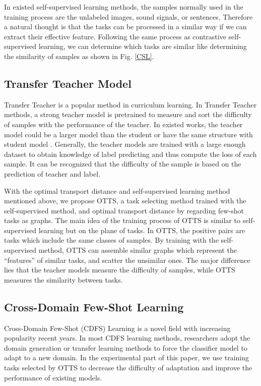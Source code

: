 \documentclass[10pt,journal,compsoc]{IEEEtran}
\begin{document}
In existed self-supervised learning methods, the samples normally used in the training process are the unlabeled images, sound signals, or sentences. Therefore a natural thought is that the tasks can be processed in a similar way if we can extract their effective feature. Following the same process as contrastive self-supervised learning, we can determine which tasks are similar like determining the similarity of samples as shown in Fig. \ref{CSL}. 

\subsection{Transfer Teacher Model}

Transfer Teacher is a popular method in curriculum learning. In Transfer Teacher methods, a strong teacher model is pretrained to measure and sort the difficulty of samples with the performance of the teacher. In existed works, the teacher model could be a larger model than the student \cite{transfer_teacher_1} or have the same structure with student model \cite{transfer_teacher_2}. Generally, the teacher models are trained with a large enough dataset to obtain knowledge of label predicting and thus compute the loss of each sample. It can be recognized that the difficulty of the sample is based on the prediction of teacher and label.

With the optimal transport distance and self-supervised learning method mentioned above, we propose OTTS, a task selecting method trained with the self-supervised method, and optimal transport distance by regarding few-shot tasks as graphs. The main idea of the training process of OTTS is similar to self-supervised learning but on the plane of tasks. In OTTS, the positive pairs are tasks which include the same classes of samples. By training with the self-supervised method, OTTS can assemble similar graphs which represent the “features” of similar tasks, and scatter the unsimilar ones. The major difference lies that the teacher models measure the difficulty of samples, while OTTS measures the similarity between tasks.

\subsection{Cross-Domain Few-Shot Learning}

Cross-Domain Few-Shot (CDFS) Learning \cite{CDFS_1,CDFS_2} is a novel field with increasing popularity recent years. In most CDFS learning methods, researchers adopt the domain generation \cite{domain_generalization_survey} or transfer learning \cite{transfer} methods to force the classifier model to adapt to a new domain. In the experimental part of this paper, we use training tasks selected by OTTS to decrease the difficulty of adaptation and improve the performance of existing models.
\end{document}
